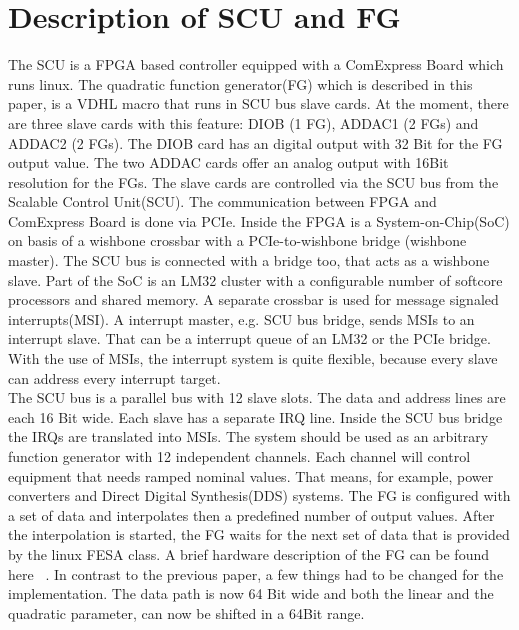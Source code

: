 \documentclass[a4paper,
              ]{jacow}
\begin{document}
\section{Description of SCU and FG}
The SCU is a FPGA based controller equipped with a ComExpress Board which runs linux. The quadratic function generator(FG) which is described in this paper, is a VDHL macro that runs in SCU bus slave cards. At the moment, there are three slave cards with this feature: DIOB (1 FG), ADDAC1 (2 FGs) and ADDAC2 (2 FGs). The DIOB card has an digital output with 32 Bit for the FG output value. The two ADDAC cards offer an analog output with 16Bit resolution for the FGs.
The slave cards are
controlled via the SCU bus from the Scalable Control Unit(SCU). The communication between FPGA and ComExpress Board is done via PCIe. Inside the FPGA is a System-on-Chip(SoC) on basis of a wishbone\cite{ref_wishbone} crossbar with a PCIe-to-wishbone bridge (wishbone master). The SCU bus is connected with a bridge too, that acts as a wishbone slave. Part of the SoC is an LM32 cluster with a configurable number of softcore processors and shared memory. A separate crossbar is used for message signaled interrupts(MSI). A interrupt master, e.g. SCU bus bridge, sends MSIs to an interrupt slave. That can be a interrupt queue of an LM32 or the PCIe bridge. With the use of MSIs, the interrupt system is quite flexible, because every slave can address every interrupt target.\\
The SCU bus is a parallel bus with 12 slave slots. The data and address lines are each 16 Bit wide. Each slave has a separate IRQ line. Inside the SCU bus bridge the IRQs are translated into MSIs.
The system should be used as an arbitrary function generator with 12 independent channels. Each channel will control equipment that needs ramped nominal values. That means, for example, power converters and Direct Digital Synthesis(DDS) systems.
The FG is configured with a set of data and interpolates then a predefined number of output values. After the interpolation is started, the FG waits for the next set of data that is provided by the linux FESA class. A brief hardware description of the FG can be found here ~\cite{ref_fg_paper}. In contrast to the previous paper, a few things had to be changed for the implementation.
The data path is now 64 Bit wide and both the linear and the quadratic parameter, can now be shifted in a 64Bit range.
\end{document}
